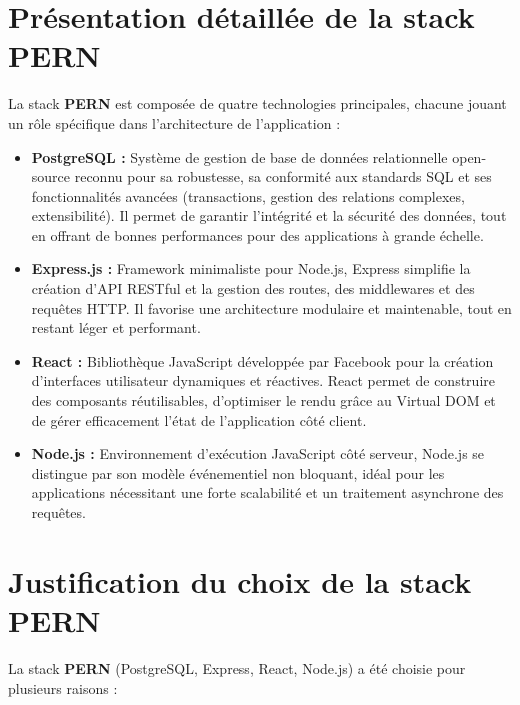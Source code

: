 \documentclass[12pt,a4paper]{report}
\begin{document}
\section*{Présentation détaillée de la stack PERN}

La stack \textbf{PERN} est composée de quatre technologies principales, chacune jouant un rôle spécifique dans l’architecture de l’application :

\begin{itemize}
    \item \textbf{PostgreSQL :} Système de gestion de base de données relationnelle open-source reconnu pour sa robustesse, sa conformité aux standards SQL et ses fonctionnalités avancées (transactions, gestion des relations complexes, extensibilité). Il permet de garantir l’intégrité et la sécurité des données, tout en offrant de bonnes performances pour des applications à grande échelle.
    \item \textbf{Express.js :} Framework minimaliste pour Node.js, Express simplifie la création d’API RESTful et la gestion des routes, des middlewares et des requêtes HTTP. Il favorise une architecture modulaire et maintenable, tout en restant léger et performant.
    \item \textbf{React :} Bibliothèque JavaScript développée par Facebook pour la création d’interfaces utilisateur dynamiques et réactives. React permet de construire des composants réutilisables, d’optimiser le rendu grâce au Virtual DOM et de gérer efficacement l’état de l’application côté client.
    \item \textbf{Node.js :} Environnement d’exécution JavaScript côté serveur, Node.js se distingue par son modèle événementiel non bloquant, idéal pour les applications nécessitant une forte scalabilité et un traitement asynchrone des requêtes.
\end{itemize}

\section*{Justification du choix de la stack PERN}

La stack \textbf{PERN} (PostgreSQL, Express, React, Node.js) a été choisie pour plusieurs raisons :  
\end{document}
